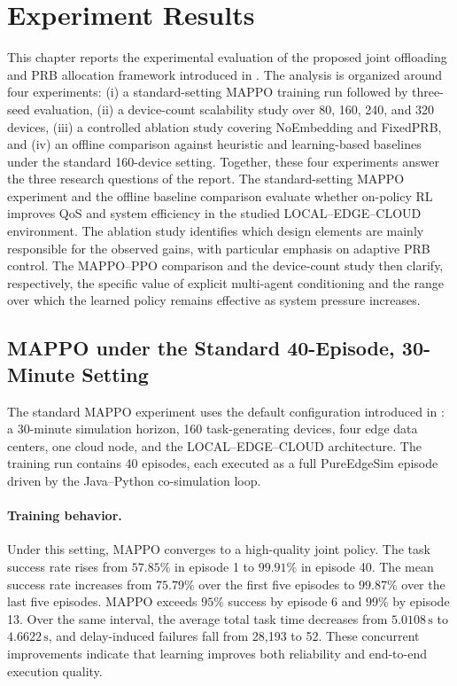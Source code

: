 \newpage
\section{Experiment Results}
\label{sec:results}

This chapter reports the experimental evaluation of the proposed joint offloading and PRB allocation framework introduced in . The analysis is organized around four experiments: (i) a standard-setting MAPPO training run followed by three-seed evaluation, (ii) a device-count scalability study over 80, 160, 240, and 320 devices, (iii) a controlled ablation study covering NoEmbedding and FixedPRB, and (iv) an offline comparison against heuristic and learning-based baselines under the standard 160-device setting. Together, these four experiments answer the three research questions of the report. The standard-setting MAPPO experiment and the offline baseline comparison evaluate whether on-policy RL improves QoS and system efficiency in the studied LOCAL--EDGE--CLOUD environment. The ablation study identifies which design elements are mainly responsible for the observed gains, with particular emphasis on adaptive PRB control. The MAPPO--PPO comparison and the device-count study then clarify, respectively, the specific value of explicit multi-agent conditioning and the range over which the learned policy remains effective as system pressure increases.

\subsection{MAPPO under the Standard 40-Episode, 30-Minute Setting}
\label{subsec:mappo-standard-setting}

The standard MAPPO experiment uses the default configuration introduced in : a 30-minute simulation horizon, 160 task-generating devices, four edge data centers, one cloud node, and the LOCAL--EDGE--CLOUD architecture. The training run contains 40 episodes, each executed as a full PureEdgeSim episode driven by the Java--Python co-simulation loop.

\paragraph{Training behavior.}
Under this setting, MAPPO converges to a high-quality joint policy. The task success rate rises from \(57.85\%\) in episode 1 to \(99.91\%\) in episode 40. The mean success rate increases from \(75.79\%\) over the first five episodes to \(99.87\%\) over the last five episodes. MAPPO exceeds \(95\%\) success by episode 6 and \(99\%\) by episode 13. Over the same interval, the average total task time decreases from \(5.0108\,\mathrm{s}\) to \(4.6622\,\mathrm{s}\), and delay-induced failures fall from 28,193 to 52. These concurrent improvements indicate that learning improves both reliability and end-to-end execution quality.

